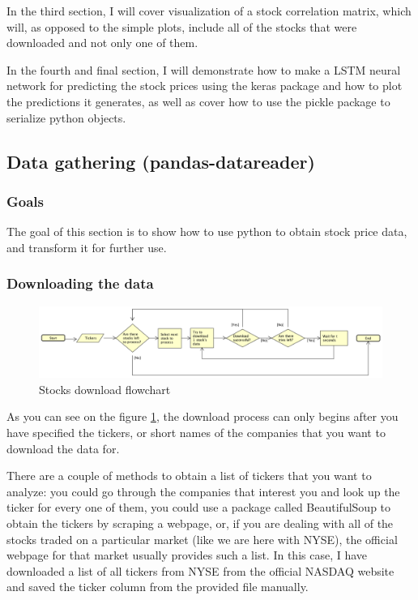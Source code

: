 \documentclass[12pt, a4paper]{article}
\begin{document}
In the third section, I will cover visualization of a stock correlation matrix, which will, as opposed to the simple plots, include all of the stocks that were downloaded and not only one of them.

In the fourth and final section, I will demonstrate how to make a LSTM neural network for predicting the stock prices using the keras package and how to plot the predictions it generates, as well as cover how to use the pickle package to serialize python objects.


\newpage
\subsection{Data gathering (pandas-datareader)}

\subsubsection{Goals}

The goal of this section is to show how to use python to obtain stock price data, and transform it for further use.

\subsubsection{Downloading the data}

\begin{figure}[H]
    \centering
    \includegraphics[width=\textwidth]{src/stocks/etl/stocks_download_chart}
    \caption{Stocks download flowchart}
    \label{fig:stocks_download_chart}
\end{figure}

As you can see on the figure \ref{fig:stocks_download_chart}, the download process can only begins after you have specified the tickers, or short names of the companies that you want to download the data for.

There are a couple of methods to obtain a list of tickers that you want to analyze: you could go through the companies that interest you and look up the ticker for every one of them, you could use a package called BeautifulSoup to obtain the tickers by scraping a webpage, or, if you are dealing with all of the stocks traded on a particular market (like we are here with NYSE), the official webpage for that market usually provides such a list. In this case, I have downloaded a list of all tickers from NYSE from the official NASDAQ website \cite{nasdaq_companylist} and saved the ticker column from the provided file  manually.
\end{document}
